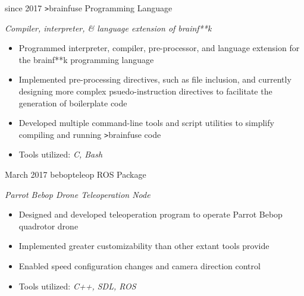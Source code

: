 \documentclass[]{friggeri-cv}
\begin{document}
\begin{entrylist}
  \entry
    {since 2017}
    {\texttt{>}brainfuse}
    {Programming Language}
    {\emph{Compiler, interpreter, \& language extension of brainf**k}
    \begin{itemize}[leftmargin=1.2em]
    \item Programmed interpreter, compiler, pre-processor, and language extension for the brainf**k programming language
    \item Implemented pre-processing directives, such as file inclusion, and currently designing more complex psuedo-instruction directives to facilitate the generation of boilerplate code
    \item Developed multiple command-line tools and script utilities to simplify compiling and running \texttt{>}brainfuse code
    \item Tools utilized: \emph{C, Bash}
    \end{itemize}}
    
  \entry
    {March 2017}
    {bebop\textunderscore teleop}
    {ROS Package}
    {\emph{Parrot Bebop Drone Teleoperation Node}
    \begin{itemize}[leftmargin=1.2em]
    \item Designed and developed teleoperation program to operate Parrot Bebop quadrotor drone
    \item Implemented greater customizability than other extant tools provide
    \item Enabled speed configuration changes and camera direction control
    \item Tools utilized: \emph{C++, SDL, ROS}
    \end{itemize}
    }
    
    
\end{entrylist}
\end{document}
